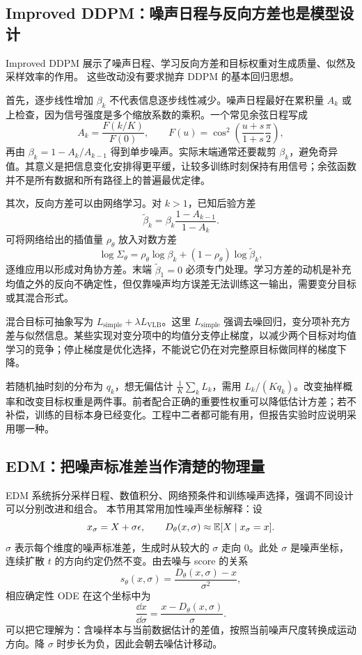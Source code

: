 \subsection{Improved DDPM：噪声日程与反向方差也是模型设计}

Improved DDPM 展示了噪声日程、学习反向方差和目标权重对生成质量、似然及采样效率的作用。\cite{m_improved} 这些改动没有要求抛弃 DDPM 的基本回归思想。

首先，逐步线性增加 $\beta_k$ 不代表信息逐步线性减少。噪声日程最好在累积量 $A_k$ 或上检查，因为信号强度是多个缩放系数的乘积。一个常见余弦日程写成
\[
 A_k=\frac{F(k/K)}{F(0)},\qquad
 F(u)=\cos^2\left(\frac{u+s}{1+s}\frac{\pi}{2}\right),
\]
再由 $\beta_k=1-A_k/A_{k-1}$ 得到单步噪声。实际末端通常还要裁剪 $\beta_k$，避免奇异值。其意义是把信息变化安排得更平缓，让较多训练时刻保持有用信号；余弦函数并不是所有数据和所有路径上的普遍最优定律。

其次，反向方差可以由网络学习。对 $k>1$，已知后验方差
\[
 \widetilde\beta_k=
 \beta_k\frac{1-A_{k-1}}{1-A_k}.
\]
可将网络给出的插值量 $\rho_\theta$ 放入对数方差
\[
 \log \Sigma_\theta=
 \rho_\theta\log\beta_k+
 (1-\rho_\theta)\log\widetilde\beta_k,
\]
逐维应用以形成对角协方差。末端 $\widetilde\beta_1=0$ 必须专门处理。学习方差的动机是补充均值之外的反向不确定性，但仅靠噪声均方误差无法训练这一输出，需要变分目标或其混合形式。

混合目标可抽象写为
$L_{\mathrm{simple}}+\lambda L_{\mathrm{VLB}}$。这里 $L_{\mathrm{simple}}$
强调去噪回归，变分项补充方差与似然信息。某些实现对变分项中的均值分支停止梯度，以减少两个目标对均值学习的竞争；停止梯度是优化选择，不能说它仍在对完整原目标做同样的梯度下降。

若随机抽时刻的分布为 $q_k$，想无偏估计
$\frac1K\sum_k L_k$，需用 $L_k/(Kq_k)$。改变抽样概率和改变目标权重是两件事。前者配合正确的重要性权重可以降低估计方差；若不补偿，训练的目标本身已经变化。工程中二者都可能有用，但报告实验时应说明采用哪一种。

\subsection{EDM：把噪声标准差当作清楚的物理量}

EDM 系统拆分采样日程、数值积分、网络预条件和训练噪声选择，强调不同设计可以分别改进和组合。\cite{m_edm} 本节用其常用加性噪声坐标解释：设
\[
 x_\sigma=X+\sigma\epsilon,\qquad
 D_\theta(x,\sigma)\approx\mathbb{E}[X\mid x_\sigma=x].
\]
$\sigma$ 表示每个维度的噪声标准差，生成时从较大的 $\sigma$ 走向 0。此处 $\sigma$ 是噪声坐标，连续扩散 $t$ 的方向约定仍然不变。由去噪与 score 的关系
\[
 s_\theta(x,\sigma)=\frac{D_\theta(x,\sigma)-x}{\sigma^2},
\]
相应确定性 ODE 在这个坐标中为
\begin{equation}
\frac{\dd x}{\dd\sigma}
=\frac{x-D_\theta(x,\sigma)}{\sigma}.
\label{eq:m-edm-ode}
\end{equation}
可以把它理解为：含噪样本与当前数据估计的差值，按照当前噪声尺度转换成运动方向。降 $\sigma$ 时步长为负，因此会朝去噪估计移动。

